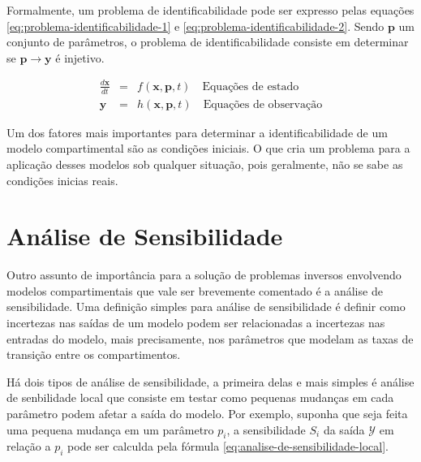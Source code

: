 
Formalmente, um problema de identificabilidade pode ser expresso pelas equações
\ref{eq:problema-identificabilidade-1} e \ref{eq:problema-identificabilidade-2}.
Sendo $\mathbf{p}$ um conjunto de parâmetros, o problema de identificabilidade
consiste em determinar se $\mathbf{p} \rightarrow \mathbf{y}$ é injetivo. 

\begin{eqnarray}
\frac{d\mathbf{x}}{dt} &=& f(\mathbf{x}, \mathbf{p}, t) \quad \text{Equações de estado} \label{eq:problema-identificabilidade-1}\\
\mathbf{y} &=& h(\mathbf{x}, \mathbf{p}, t) \quad \text{Equações de observação} \label{eq:problema-identificabilidade-2}
\end{eqnarray}

Um dos fatores mais importantes para determinar a identificabilidade de um modelo
compartimental são as condições iniciais. O que cria um problema para a aplicação
desses modelos sob qualquer situação, pois geralmente, não se sabe as condições
inicias reais.

\section{Análise de Sensibilidade}

Outro assunto de importância para a solução de problemas inversos envolvendo modelos 
compartimentais que vale ser brevemente comentado é a análise de sensibilidade. 
Uma definição simples para análise de sensibilidade é definir como incertezas nas 
saídas de um modelo podem ser relacionadas a incertezas nas entradas do modelo, 
mais precisamente, nos parâmetros que modelam as taxas de transição entre os 
compartimentos. 

Há dois tipos de análise de sensibilidade, a primeira delas e mais simples é 
análise de senbilidade local que consiste em testar como pequenas mudanças em cada
parâmetro podem afetar a saída do modelo. Por exemplo, suponha que seja feita
uma pequena mudança em um parâmetro $p_i$, a sensibilidade $S_i$ da saída $\mathcal{Y}$ 
em relação a $p_i$ pode ser calculda pela fórmula \ref{eq:analise-de-sensibilidade-local}.

